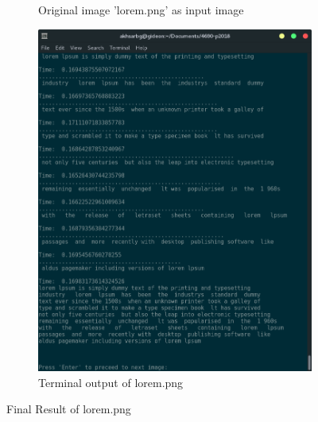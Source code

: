 \documentclass[Report.tex]{subfiles}
\begin{document}
\begin{figure}[H]
  \begin{subfigure}[t]{\textwidth}
    \centering
    \caption{Original image 'lorem.png' as input image}
  \end{subfigure}
  \begin{subfigure}[t]{\textwidth}
    \centering
    \includegraphics[width=12cm]{res/lorem_output.png}
    \caption{Terminal output of lorem.png}
  \end{subfigure}
  \caption{Final Result of lorem.png}
  \label{fig:Result:Final_result}
\end{figure}
\end{document}
